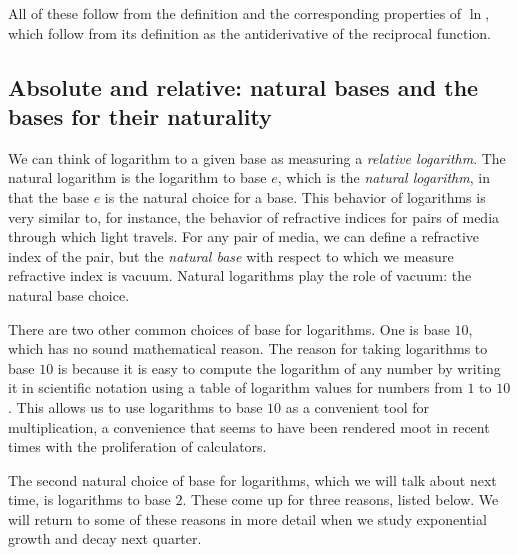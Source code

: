 \documentclass[10pt]{amsart}
\begin{document}
All of these follow from the definition and the corresponding
properties of $\ln$, which follow from its definition as the
antiderivative of the reciprocal function.

\subsection{Absolute and relative: natural bases and the bases for their naturality}
We can think of logarithm to a given base as measuring a {\em relative
logarithm}. The natural logarithm is the logarithm to base $e$, which
is the {\em natural logarithm}, in that the base $e$ is the natural
choice for a base. This behavior of logarithms is very similar to, for
instance, the behavior of refractive indices for pairs of media
through which light travels. For any pair of media, we can define a
refractive index of the pair, but the {\em natural base} with respect
to which we measure refractive index is vacuum. Natural logarithms
play the role of vacuum: the natural base choice.

There are two other common choices of base for logarithms. One is base
$10$, which has no sound mathematical reason. The reason for taking
logarithms to base $10$ is because it is easy to compute the logarithm
of any number by writing it in scientific notation using a table of
logarithm values for numbers from $1$ to $10$. This allows us to use
logarithms to base $10$ as a convenient tool for multiplication, a
convenience that seems to have been rendered moot in recent times with
the proliferation of calculators.

The second natural choice of base for logarithms, which we will talk
about next time, is logarithms to base $2$. These come up for three
reasons, listed below. We will return to some of these reasons in more
detail when we study exponential growth and decay next quarter.
\end{document}
